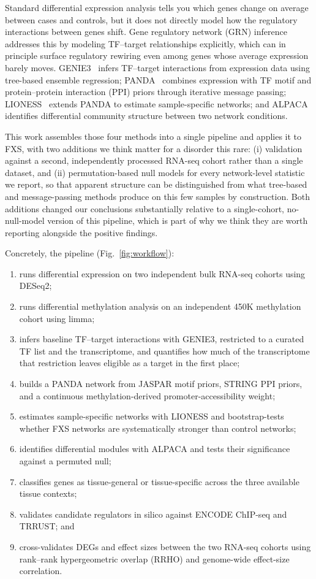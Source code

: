 \documentclass[journal]{IEEEtran}
\begin{document}
Standard differential expression analysis tells you which genes change on average between cases and controls, but it does not directly model how the regulatory interactions between genes shift. Gene regulatory network (GRN) inference addresses this by modeling TF--target relationships explicitly, which can in principle surface regulatory rewiring even among genes whose average expression barely moves. GENIE3~\cite{genie3} infers TF--target interactions from expression data using tree-based ensemble regression; PANDA~\cite{panda} combines expression with TF motif and protein--protein interaction (PPI) priors through iterative message passing; LIONESS~\cite{lioness} extends PANDA to estimate sample-specific networks; and ALPACA~\cite{alpaca} identifies differential community structure between two network conditions.

This work assembles those four methods into a single pipeline and applies it to FXS, with two additions we think matter for a disorder this rare: (i) validation against a second, independently processed RNA-seq cohort rather than a single dataset, and (ii) permutation-based null models for every network-level statistic we report, so that apparent structure can be distinguished from what tree-based and message-passing methods produce on this few samples by construction. Both additions changed our conclusions substantially relative to a single-cohort, no-null-model version of this pipeline, which is part of why we think they are worth reporting alongside the positive findings.

Concretely, the pipeline (Fig.~\ref{fig:workflow}):
\begin{enumerate}
\item runs differential expression on two independent bulk RNA-seq cohorts using DESeq2;
\item runs differential methylation analysis on an independent 450K methylation cohort using limma;
\item infers baseline TF--target interactions with GENIE3, restricted to a curated TF list and the transcriptome, and quantifies how much of the transcriptome that restriction leaves eligible as a target in the first place;
\item builds a PANDA network from JASPAR motif priors, STRING PPI priors, and a continuous methylation-derived promoter-accessibility weight;
\item estimates sample-specific networks with LIONESS and bootstrap-tests whether FXS networks are systematically stronger than control networks;
\item identifies differential modules with ALPACA and tests their significance against a permuted null;
\item classifies genes as tissue-general or tissue-specific across the three available tissue contexts;
\item validates candidate regulators in silico against ENCODE ChIP-seq and TRRUST; and
\item cross-validates DEGs and effect sizes between the two RNA-seq cohorts using rank--rank hypergeometric overlap (RRHO) and genome-wide effect-size correlation.
\end{enumerate}
\end{document}
